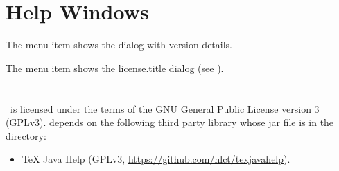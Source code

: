 \chapter{Help Windows}
\label{sec:helpwindows}


The  menu item shows the
dialog with version details.


The  menu item shows the
\InlineMsgDef
 {license.title}
dialog (see ).




\chapter{}
\label{sec:licence}

%
\JDRView\ is licensed under the terms of the 
\href{https://www.gnu.org/licenses/gpl-3.0.html}{GNU General
Public License version 3 (GPLv3)}.
 depends on the following third party library whose jar
file is in the  directory:
\begin{itemize}
   \item TeX Java Help 
   (GPLv3, \url{https://github.com/nlct/texjavahelp}).
\end{itemize}



\printmain
\printindex 

 

